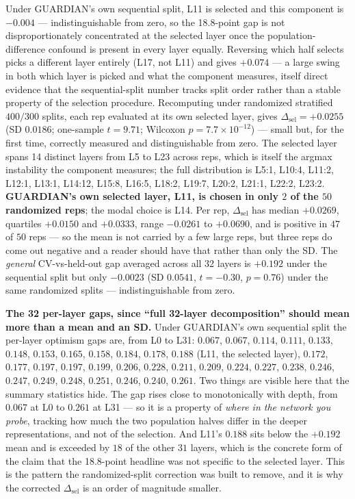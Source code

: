 \documentclass[10pt]{article} %
\begin{document}
Under GUARDIAN's own sequential split, L11 is selected and this component is
$-0.004$ --- indistinguishable from zero, so the 18.8-point gap is not
disproportionately concentrated at the selected layer once the
population-difference confound is present in every layer equally. Reversing
which half selects picks a different layer entirely (L17, not L11) and gives
$+0.074$ --- a large swing in both which layer is picked and what the component
measures, itself direct evidence that the sequential-split number tracks split
order rather than a stable property of the selection procedure. Recomputing
under randomized stratified $400/300$ splits, each rep evaluated at its own
selected layer, gives $\Delta_{\text{sel}}=+0.0255$ (SD $0.0186$; one-sample
$t=9.71$; Wilcoxon $p=7.7\times10^{-12}$) --- small but, for the first time,
correctly measured and distinguishable from zero. The selected layer spans 14
distinct layers from L5 to L23 across reps, which is itself the argmax
instability the component measures; the full distribution is
L5:1, L10:4, L11:2, L12:1, L13:1, L14:12, L15:8, L16:5, L18:2, L19:7, L20:2,
L21:1, L22:2, L23:2. \textbf{GUARDIAN's own selected layer, L11, is chosen in
only $2$ of the $50$ randomized reps}; the modal choice is L14. Per rep,
$\Delta_{\text{sel}}$ has median $+0.0269$, quartiles $+0.0150$ and $+0.0333$,
range $-0.0261$ to $+0.0690$, and is positive in $47$ of $50$ reps --- so the
mean is not carried by a few large reps, but three reps do come out negative
and a reader should have that rather than only the SD. The \emph{general} CV-vs-held-out gap averaged across all
32 layers is $+0.192$ under the sequential split but only $-0.0023$ (SD
$0.0541$, $t=-0.30$, $p=0.76$) under the same randomized splits ---
indistinguishable from zero.

\textbf{The 32 per-layer gaps, since ``full 32-layer decomposition'' should
mean more than a mean and an SD.} Under GUARDIAN's own sequential split the
per-layer optimism gaps are, from L0 to L31:
$0.067$, $0.067$, $0.114$, $0.111$, $0.133$, $0.148$, $0.153$, $0.165$,
$0.158$, $0.184$, $0.178$, $\mathbf{0.188}$ (L11, the selected layer),
$0.172$, $0.177$, $0.197$, $0.197$, $0.199$, $0.206$, $0.228$, $0.211$,
$0.209$, $0.224$, $0.227$, $0.238$, $0.246$, $0.247$, $0.249$, $0.248$,
$0.251$, $0.246$, $0.240$, $0.261$. Two things are visible here that the
summary statistics hide. The gap rises close to monotonically with depth, from
$0.067$ at L0 to $0.261$ at L31 --- so it is a property of \emph{where in the
network you probe}, tracking how much the two population halves differ in the
deeper representations, and not of the selection. And L11's $0.188$ sits below
the $+0.192$ mean and is exceeded by $18$ of the other $31$ layers, which is
the concrete form of the claim that the 18.8-point headline was not specific to
the selected layer. This is the pattern the randomized-split correction was
built to remove, and it is why the corrected $\Delta_{\text{sel}}$ is an order
of magnitude smaller.
\end{document}
